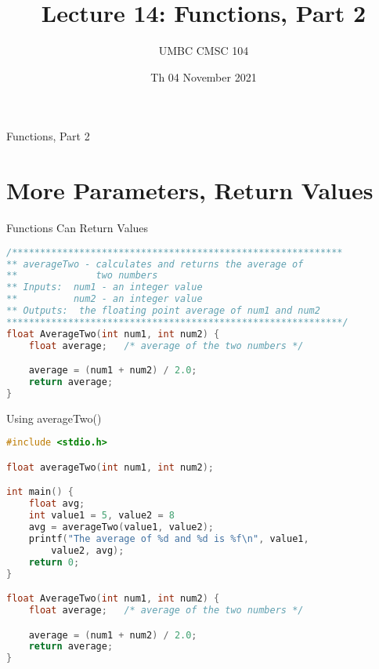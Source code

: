 \documentclass[graphics]{beamer}
\title{Lecture 14: Functions, Part 2}
\author{UMBC CMSC 104}
\date{Th 04 November 2021}
\begin{document}
\begin{frame}{}
\centering
    Functions, Part 2
\end{frame}

\frame{\tableofcontents}

\section{More Parameters, Return Values}
\begin{frame}[fragile]{Functions Can Return Values}
    \begin{lstlisting}[language=C,basicstyle=\footnotesize,keywordstyle=\color{blue},commentstyle=\color{green},showstringspaces=false,stringstyle=\color{red}]
/***********************************************************
** averageTwo - calculates and returns the average of
**              two numbers
** Inputs:  num1 - an integer value
**          num2 - an integer value
** Outputs:  the floating point average of num1 and num2
************************************************************/
float AverageTwo(int num1, int num2) {
	float average;   /* average of the two numbers */

	average = (num1 + num2) / 2.0;
	return average;
}
    \end{lstlisting}
\end{frame}

\begin{frame}[fragile]{Using averageTwo()}
    \begin{lstlisting}[language=C,basicstyle=\footnotesize,keywordstyle=\color{blue},commentstyle=\color{green},showstringspaces=false,stringstyle=\color{red}]
#include <stdio.h>

float averageTwo(int num1, int num2);

int main() {
    float avg;
    int value1 = 5, value2 = 8
    avg = averageTwo(value1, value2);
    printf("The average of %d and %d is %f\n", value1,
        value2, avg);
    return 0;
}

float AverageTwo(int num1, int num2) {
	float average;   /* average of the two numbers */

	average = (num1 + num2) / 2.0;
	return average;
}
    \end{lstlisting}
\end{frame}
\end{document}
